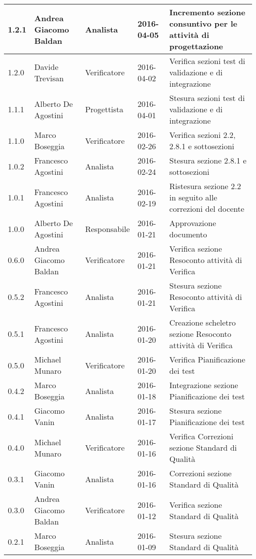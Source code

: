 \documentclass{scalatekids-article}
\begin{document}
\begin{center}
\begin{longtable}{| l | l | l | l | p{5cm} |}
    \hline
    1.2.1 & Andrea Giacomo Baldan & Analista & 2016-04-05 & Incremento sezione consuntivo per le attività di progettazione\\
    \hline
    1.2.0 & Davide Trevisan & Verificatore & 2016-04-02 & Verifica sezioni test di validazione e di integrazione\\
    \hline
    1.1.1 & Alberto De Agostini & Progettista & 2016-04-01 & Stesura sezioni test di validazione e di integrazione\\
    \hline
    1.1.0 & Marco Boseggia & Verificatore & 2016-02-26 & Verifica sezioni 2.2, 2.8.1 e sottosezioni\\
    \hline
    1.0.2 & Francesco Agostini & Analista & 2016-02-24 & Stesura sezione 2.8.1 e sottosezioni\\
    \hline
    1.0.1 & Francesco Agostini & Analista & 2016-02-19 & Ristesura sezione 2.2 in seguito alle correzioni del docente\\
    \hline
    1.0.0 & Alberto De Agostini & Responsabile & 2016-01-21 & Approvazione documento\\
    \hline
    0.6.0 & Andrea Giacomo Baldan & Verificatore & 2016-01-21 & Verifica sezione Resoconto attività di Verifica\\
    \hline
    0.5.2 & Francesco Agostini & Analista & 2016-01-21 & Stesura sezione Resoconto attività di Verifica\\
    \hline
    0.5.1 & Francesco Agostini & Analista & 2016-01-20 & Creazione scheletro sezione Resoconto attività di Verifica\\
    \hline
    0.5.0 & Michael Munaro & Verificatore & 2016-01-20 & Verifica Pianificazione dei test\\
    \hline
    0.4.2 & Marco Boseggia & Analista & 2016-01-18 & Integrazione sezione Pianificazione dei test\\
    \hline
    0.4.1 & Giacomo Vanin & Analista & 2016-01-17 & Stesura sezione Pianificazione dei test\\
    \hline
    0.4.0 & Michael Munaro & Verificatore & 2016-01-16 & Verifica Correzioni sezione Standard di Qualità\\
    \hline
    0.3.1 & Giacomo Vanin & Analista & 2016-01-16 & Correzioni sezione Standard di Qualità\\
    \hline
    0.3.0 & Andrea Giacomo Baldan & Verificatore & 2016-01-12 & Verifica sezione Standard di Qualità\\
    \hline
    0.2.1 & Marco Boseggia & Analista & 2016-01-09 & Stesura sezione Standard di Qualità\\

\end{longtable}
\end{center}
\end{document}
